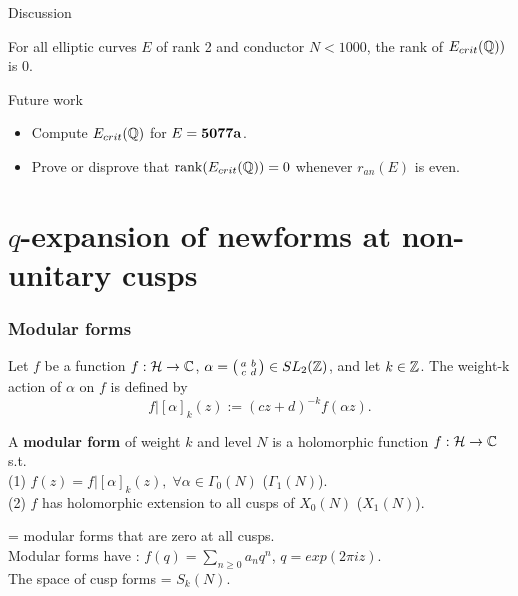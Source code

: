\documentclass[handout]{beamer}
\begin{document}
\begin{frame}{Discussion}

\begin{Corollary}
For all elliptic curves $E$ of rank 2 and conductor $N <1000$, the rank of $E_{crit}(\mathbb{Q}))$ is 0.
\end{Corollary}
\pause
\smallskip
Future work
\begin{itemize}
\item Compute $E_{crit}(\mathbb{Q})$ for $E = {\bf 5077a}$.

\item Prove or disprove that $\rank(E_{crit}(\mathbb{Q})) = 0$ whenever $r_{an}(E)$ is even.
\end{itemize}

\end{frame}







\section{$q$-expansion of newforms at non-unitary cusps} 

 \begin{frame}
 \frametitle{\insertsection}
 \tableofcontents[currentsection]
 \end{frame}





\begin{frame}
\frametitle{Modular forms}
Let $f$ be a function $f: \mathcal{H} \to \mathbb{C}$,  $\alpha  = \left( \begin{smallmatrix}a&b\\c&d\end{smallmatrix}\right) \in SL_2(\mathbb{Z})$, and let $k \in \mathbb{Z}$. The weight-k action of $\alpha$ on $f$ is
defined by
\[
	f|[\alpha]_k(z) := (cz+d)^{-k}f(\alpha z).
\]

\pause

\begin{Def}
A \textbf{modular form} of weight $k$ and level $N$ is a holomorphic function $f: \mathcal{H} \to \mathbb{C}$ s.t. \\
(1) $f(z)  = f|[\alpha]_k(z), \; \forall \alpha \in \Gamma_0(N)$ ($\Gamma_1(N)$). \\
(2) $f$ has holomorphic extension to all cusps of $X_0(N)$ ($X_1(N)$). \\
\end{Def}

\pause

 = modular forms that are zero at all cusps. \\
Modular forms have : $f(q) = \sum_{n \geq 0} a_n q^n$, $q = exp(2\pi i z)$. \\
The space of cusp forms = $S_k(N)$. 

\end{frame}
\end{document}
